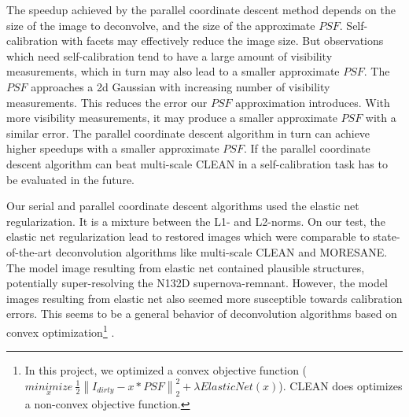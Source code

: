 The speedup achieved by the parallel coordinate descent method depends on the size of the image to deconvolve, and the size of the approximate $PSF$. Self-calibration with facets may effectively reduce the image size. But observations which need self-calibration tend to have a large amount of visibility measurements, which in turn may also lead to a smaller approximate $PSF$. The $PSF$ approaches a 2d Gaussian with increasing number of visibility measurements. This reduces the error our $PSF$ approximation introduces. With more visibility measurements, it may produce a smaller approximate $PSF$ with a similar error. The parallel coordinate descent algorithm in turn can achieve higher speedups with a smaller approximate $PSF$. If the parallel coordinate descent algorithm can beat multi-scale CLEAN in a self-calibration task has to be evaluated in the future.


Our serial and parallel coordinate descent algorithms used the elastic net regularization. It is a mixture between the L1- and L2-norms. On our test, the elastic net regularization lead to restored images which were comparable to state-of-the-art deconvolution algorithms like multi-scale CLEAN and MORESANE. The model image resulting from elastic net contained plausible structures, potentially super-resolving the N132D supernova-remnant. However, the model images resulting from elastic net also seemed more susceptible towards calibration errors. This seems to be a general behavior of deconvolution algorithms based on convex optimization\footnote{In this project, we optimized a convex objective function ($\underset{x}{minimize} \: \frac{1}{2} \left \| I_{dirty} - x * PSF \right \|_2^2 + \lambda ElasticNet(x)$). CLEAN does optimizes a non-convex objective function.} \cite{offringa2017optimized}.

